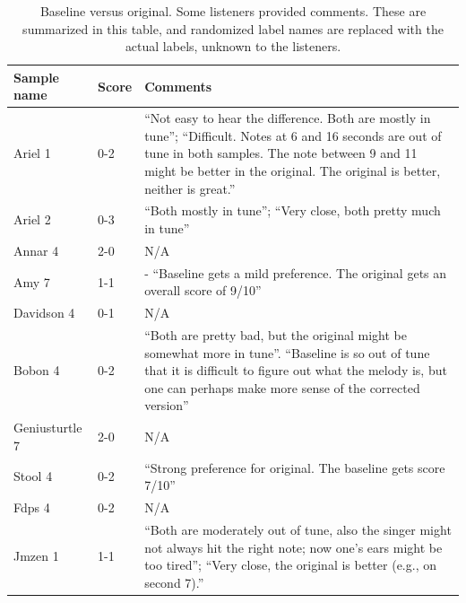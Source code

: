 \begin{table}
  \begin{center}
    \label{tab:baseline-scores}
    \begin{tabularx}{\columnwidth}{|l|l|X|}
    \hline
\textbf{Sample name} & \textbf{Score} & \textbf{Comments} \\
\hline\hline
Ariel 1 & 0-2 & ``Not easy to hear the difference. Both are mostly in tune''; ``Difficult. Notes at 6 and 16 seconds are out of tune in both samples. The note between 9 and 11 might be better in the original. The original is better, neither is great.''\\
\hline
Ariel 2 & 0-3 & ``Both mostly in tune''; ``Very close, both pretty much in tune''\\ 
\hline
Annar 4 & 2-0 & N/A\\ 
\hline
Amy 7 & 1-1 & - ``Baseline gets a mild preference. The original gets an overall score of 9/10''\\
\hline
Davidson 4 & 0-1 & N/A\\ 
\hline
Bobon 4 & 0-2 & ``Both are pretty bad, but the original might be somewhat more in tune''. ``Baseline is so out of tune that it is difficult to figure out what the melody is, but one can perhaps make more sense of the corrected version'' \\ 
\hline
Geniusturtle 7 & 2-0 & N/A\\ 
\hline
Stool 4 & 0-2 & ``Strong preference for original. The baseline gets score 7/10''\\ 
\hline
Fdps 4 & 0-2 & N/A\\ 
\hline
Jmzen 1 & 1-1 & ``Both are moderately out of tune, also the singer might not always hit the right note; now one's ears might be too tired''; ``Very close, the original is better (e.g., on second 7).'' \\ 
\hline
    \end{tabularx}
    \caption{Baseline versus original. Some listeners provided comments. These are summarized in this table, and randomized label names are replaced with the actual labels, unknown to the listeners.}
  \end{center}
\end{table}

